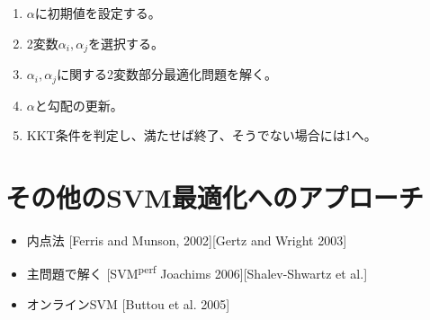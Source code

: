 \documentclass[10pt,a4paper]{jsarticle}
\begin{document}
\begin{enumerate}
\item $\alpha$に初期値を設定する。
\item 2変数$\alpha_{i},\alpha_{j}$を選択する。
\item $\alpha_{i},\alpha_{j}$に関する2変数部分最適化問題を解く。
\item $\alpha$と勾配の更新。
\item KKT条件を判定し、満たせば終了、そうでない場合には1へ。

\end{enumerate}

\section{その他のSVM最適化へのアプローチ}

\begin{itemize}
\item 内点法 [Ferris and Munson, 2002][Gertz and Wright 2003]
\item 主問題で解く [SVM\textsuperscript{perf} Joachims 2006][Shalev-Shwartz et al.]
\item オンラインSVM [Buttou et al. 2005]
\end{itemize}
\end{document}
